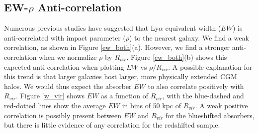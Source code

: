 \documentclass[iop]{emulateapj-rtx4}
\begin{document}
\vspace{10pt}


\subsection{EW-$\rho$ Anti-correlation}
Numerous previous studies have suggested that Ly$\alpha$ equivalent width ($EW$) is anti-correlated with impact parameter ($\rho$) to the nearest galaxy. We find a weak correlation, as shown in Figure \ref{ew_both}(a). However, we find a stronger anti-correlation when we normalize $\rho$ by $R_{vir}$. Figure \ref{ew_both}(b) shows this expected anti-correlation when plotting $EW$ vs $\rho/R_{vir}$. A possible explanation for this trend is that larger galaxies host larger, more physically extended CGM halos. We would thus expect the absorber $EW$ to also correlate positively with $R_{vir}$. Figure \ref{w_vir} shows $EW$ as a function of $R_{vir}$, with the blue-dashed and red-dotted lines show the average $EW$ in bins of 50 kpc of $R_{vir}$. A weak positive correlation is possibly present between $EW$ and $R_{vir}$ for the blueshifted absorbers, but there is little evidence of any correlation for the redshifted sample. 



\end{document}
